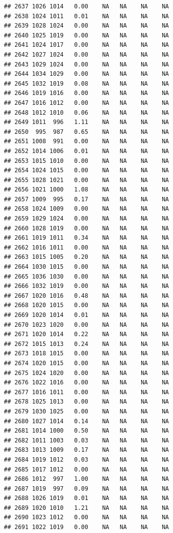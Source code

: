 \documentclass{article}\usepackage{graphicx, color}
\makeatletter
\newenvironment{kframe}{%
 \def\at@end@of@kframe{}%
 \ifinner\ifhmode%
  \def\at@end@of@kframe{\end{minipage}}%
  \begin{minipage}{\columnwidth}%
 \fi\fi%
 \def\FrameCommand##1{\hskip\@totalleftmargin \hskip-\fboxsep
 \colorbox{shadecolor}{##1}\hskip-\fboxsep
     \hskip-\linewidth \hskip-\@totalleftmargin \hskip\columnwidth}%
 \MakeFramed {\advance\hsize-\width
   \@totalleftmargin\z@ \linewidth\hsize
   \@setminipage}}%
 {\par\unskip\endMakeFramed%
 \at@end@of@kframe}
\newenvironment{knitrout}{}{} %
\makeatother
\begin{document}
\begin{knitrout}
\begin{kframe}
\begin{verbatim}
## 2637 1026 1014   0.00    NA   NA    NA    NA
## 2638 1024 1011   0.01    NA   NA    NA    NA
## 2639 1028 1024   0.00    NA   NA    NA    NA
## 2640 1025 1019   0.00    NA   NA    NA    NA
## 2641 1024 1017   0.00    NA   NA    NA    NA
## 2642 1027 1024   0.00    NA   NA    NA    NA
## 2643 1029 1024   0.00    NA   NA    NA    NA
## 2644 1034 1029   0.00    NA   NA    NA    NA
## 2645 1032 1019   0.08    NA   NA    NA    NA
## 2646 1019 1016   0.00    NA   NA    NA    NA
## 2647 1016 1012   0.00    NA   NA    NA    NA
## 2648 1012 1010   0.06    NA   NA    NA    NA
## 2649 1011  996   1.11    NA   NA    NA    NA
## 2650  995  987   0.65    NA   NA    NA    NA
## 2651 1008  991   0.00    NA   NA    NA    NA
## 2652 1014 1006   0.01    NA   NA    NA    NA
## 2653 1015 1010   0.00    NA   NA    NA    NA
## 2654 1024 1015   0.00    NA   NA    NA    NA
## 2655 1028 1021   0.00    NA   NA    NA    NA
## 2656 1021 1000   1.08    NA   NA    NA    NA
## 2657 1009  995   0.17    NA   NA    NA    NA
## 2658 1024 1009   0.00    NA   NA    NA    NA
## 2659 1029 1024   0.00    NA   NA    NA    NA
## 2660 1028 1019   0.00    NA   NA    NA    NA
## 2661 1019 1011   0.34    NA   NA    NA    NA
## 2662 1016 1011   0.00    NA   NA    NA    NA
## 2663 1015 1005   0.20    NA   NA    NA    NA
## 2664 1030 1015   0.00    NA   NA    NA    NA
## 2665 1036 1030   0.00    NA   NA    NA    NA
## 2666 1032 1019   0.00    NA   NA    NA    NA
## 2667 1020 1016   0.48    NA   NA    NA    NA
## 2668 1020 1015   0.00    NA   NA    NA    NA
## 2669 1020 1014   0.01    NA   NA    NA    NA
## 2670 1023 1020   0.00    NA   NA    NA    NA
## 2671 1020 1014   0.22    NA   NA    NA    NA
## 2672 1015 1013   0.24    NA   NA    NA    NA
## 2673 1018 1015   0.00    NA   NA    NA    NA
## 2674 1020 1015   0.00    NA   NA    NA    NA
## 2675 1024 1020   0.00    NA   NA    NA    NA
## 2676 1022 1016   0.00    NA   NA    NA    NA
## 2677 1016 1011   0.00    NA   NA    NA    NA
## 2678 1025 1013   0.00    NA   NA    NA    NA
## 2679 1030 1025   0.00    NA   NA    NA    NA
## 2680 1027 1014   0.14    NA   NA    NA    NA
## 2681 1014 1000   0.50    NA   NA    NA    NA
## 2682 1011 1003   0.03    NA   NA    NA    NA
## 2683 1013 1009   0.17    NA   NA    NA    NA
## 2684 1019 1012   0.03    NA   NA    NA    NA
## 2685 1017 1012   0.00    NA   NA    NA    NA
## 2686 1012  997   1.00    NA   NA    NA    NA
## 2687 1019  997   0.09    NA   NA    NA    NA
## 2688 1026 1019   0.01    NA   NA    NA    NA
## 2689 1020 1010   1.21    NA   NA    NA    NA
## 2690 1023 1012   0.00    NA   NA    NA    NA
## 2691 1022 1019   0.00    NA   NA    NA    NA

\end{verbatim}
\end{kframe}
\end{knitrout}
\end{document}
